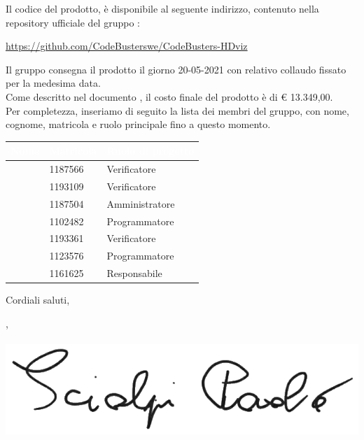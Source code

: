 \documentclass[11pt]{letter}
\begin{document}
\begin{letter}
\begin{itemize}
\begin{itemize}
            \end{itemize}
        \end{itemize}
        Il codice del prodotto, è disponibile al seguente indirizzo, contenuto nella repository ufficiale del gruppo \Gruppo{}:
        \begin{center}
        \url{https://github.com/CodeBusterswe/CodeBusters-HDviz}
        \end{center}
        Il gruppo consegna il prodotto il giorno 20-05-2021 con relativo collaudo fissato per la medesima data.\\Come descritto nel documento , il costo finale del prodotto è di  \euro{} 13.349,00.\\
        Per completezza, inseriamo di seguito la lista dei membri del gruppo, con nome, cognome, matricola e ruolo principale fino a questo momento.
        {
            \renewcommand{\arraystretch}{2}
            \begin{longtable}{ C{4cm} C{4cm} C{4cm}}
                \textcolor{white}{\textbf{Nome}} & \textcolor{white}{\textbf{Matricola}} & \textcolor{white}{\textbf{Ruolo di progetto}}\\
                \endhead 
                \SG{} & 1187566 & Verificatore\\
                \BM{} & 1193109 & Verificatore\\
                \RA{} & 1187504 & Amministratore\\
                \SH{} & 1102482 & Programmatore\\
                \PA{} & 1193361 & Verificatore\\
                \ZM{} & 1123576 & Programmatore\\
                \SP{} & 1161625 & Responsabile\\
            \end{longtable}
        }
        Cordiali saluti,
        \begin{flushright}
        	\closing{\SP{}, \\ \textit{\Responsabile{}} \\\includegraphics[width=.6\linewidth]{Utility/Images/firmaSP.png}} 
        \end{flushright}
    \end{letter}
\end{document}
